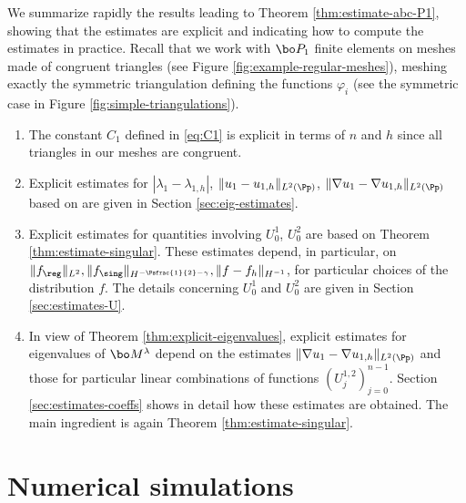 \begin{rem}
We summarize rapidly the results leading to Theorem \ref{thm:estimate-abc-P1}, showing that the estimates are explicit and indicating how to compute the estimates in practice. Recall that we work with $\bo P_1$ finite elements on meshes made of congruent triangles (see Figure \ref{fig:example-regular-meshes}), meshing exactly the symmetric triangulation defining the functions $\varphi_i$ (see the symmetric case in Figure \ref{fig:simple-triangulations}).

\begin{enumerate}
\item
The constant $C_1$ defined in \eqref{eq:C1} is explicit in terms of $n$ and $h$ since all triangles in our meshes are congruent.

\item
Explicit estimates for $|\lambda_1-\lambda_{1,h}|$, $\|u_1-u_{1,h}\|_{L^2(\Pp)}$, $\|\nabla u_1-\nabla u_{1,h}\|_{L^2(\Pp)}$ based on \cite{LiOi13} are given in Section \ref{sec:eig-estimates}.

\item
Explicit estimates for quantities involving $U_0^1$, $U_0^2$ are based on Theorem \ref{thm:estimate-singular}. These estimates depend, in particular, on $\|f_{\reg}\|_{L^2}, \|f_{\sing}\|_{H^{-\Psfrac{1}{2}-\gamma}}, \|f-f_h\|_{H^{-1}}$, for particular choices of the distribution $f$. The details concerning $U_0^1$ and $U_0^2$ are given in Section \ref{sec:estimates-U}.

\item
In view of Theorem \ref{thm:explicit-eigenvalues}, explicit estimates for eigenvalues of $\bo M^\lambda$ depend on the estimates $\|\nabla u_1-\nabla u_{1,h}\|_{L^2(\Pp)}$ and those for particular linear combinations of functions $(U_j^{1,2})_{j=0}^{n-1}$. Section \ref{sec:estimates-coeffs} shows in detail how these estimates are obtained. The main ingredient is again Theorem \ref{thm:estimate-singular}.
\end{enumerate}
\end{rem}

\section{Numerical simulations}\label{bobu200.s6}

